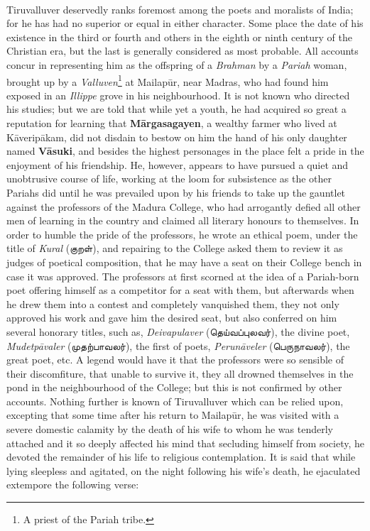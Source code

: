 \documentclass{article}
\newcommand{\TamilText}[1]{\texttamil{#1}}
\newcommand{\tam}[1]{\TamilText{#1}}
\begin{document}
\paragraph{}
Tiruvalluver deservedly ranks foremost among the poets and moralists of India; for he has had no superior or equal in either character. Some place the date of his existence in the third or fourth and others in the eighth or ninth century of the Christian era, but the last is generally considered as most probable. All accounts concur in representing him as the offspring of a \emph{Brahman} by a \emph{Pariah} woman, brought up by a \emph{Valluven}\footnote{A priest of the Pariah tribe.} at Mailap\={u}r, near Madras, who had found him exposed in an \emph{Illippe} grove in his neighbourhood. It is not known who directed his studies; but we are told that while yet a youth, he had acquired so great a reputation for learning that \textbf{M\={a}rgasagayen}, a wealthy farmer who lived at K\={a}verip\={a}kam, did not disdain to bestow on him the hand of his only daughter named \textbf{V\={a}suki}, and besides the highest personages in the place felt a pride in the enjoyment of his friendship. He, however, appears to have pursued a quiet and unobtrusive course of life, working at the loom for subsistence as the other Pariahs did until he was prevailed upon by his friends to take up the gauntlet against the professors of the Madura College, who had arrogantly defied all other men of learning in the country and claimed all literary honours to themselves. In order to humble the pride of the professors, he wrote an ethical poem, under the title of \emph{Kural} (\tam{குறள்}), and repairing to the College asked them to review it as judges of poetical composition, that he may have a seat on their College bench in case it was approved. The professors at first scorned at the idea of a Pariah-born poet offering himself as a competitor for a seat with them, but afterwards when he drew them into a contest and completely vanquished them, they not only approved his work and gave him the desired seat, but also conferred on him several honorary titles, such as, \emph{Deivapulaver} (\tam{தெய்வப்புலவர்}), the divine poet, \emph{Mudetp\={a}valer} (\tam{முதற்பாவலர்}), the first of poets, \emph{Perun\={a}veler} (\tam{பெருநாவலர்}), the great poet, etc. A legend would have it that the professors were so sensible of their discomfiture, that unable to survive it, they all drowned themselves in the pond in the neighbourhood of the College; but this is not confirmed by other accounts. Nothing further is known of Tiruvalluver which can be relied upon, excepting that some time after his return to Mailap\={u}r, he was visited with a severe domestic calamity by the death of his wife to whom he was tenderly attached and it so deeply affected his mind that secluding himself from society, he devoted the remainder of his life to religious contemplation. It is said that while lying sleepless and agitated, on the night following his wife's death, he ejaculated extempore the following verse:
\end{document}
